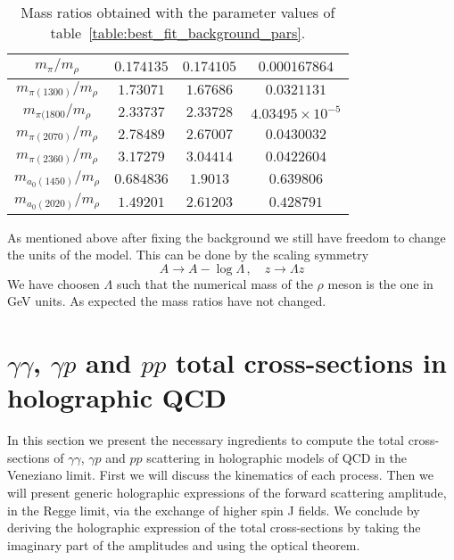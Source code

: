 \documentclass[a4paper,12pt]{article}
\begin{document}
\begin{table}
\begin{tabular}{ | c | c | c | c | }
$m_\pi / m_\rho$ & $0.174135$ & $0.174105$ & $0.000167864$ \\
\hline
$m_{\pi(1300)} / m_\rho$ & $1.73071$ & $1.67686$ & $0.0321131$ \\
\hline
$m_{\pi(1800} / m_\rho$ & $2.33737$ & $2.33728$ & $4.03495 \times 10^{-5}$ \\
\hline
$m_{\pi(2070)} / m_\rho$ & $2.78489$ & $2.67007$ & $0.0430032$ \\
\hline
$m_{\pi(2360)} / m_\rho$ & $3.17279$ & $3.04414$ & $0.0422604$ \\
\hline
$m_{a_0(1450)} / m_\rho$ & $0.684836$ & $1.9013$ & $0.639806$ \\
\hline
$m_{a_0(2020)} / m_\rho$ & $1.49201$ & $2.61203$ & $0.428791$ \\
\hline
\end{tabular}
\caption{Mass ratios obtained with the parameter values of table~\ref{table:best_fit_background_pars}.}
\label{table:best spectrum fit} 
\end{table}

As mentioned above after fixing the background we still have freedom to change the units of the model. This can be done by the scaling symmetry
\begin{equation}
A \rightarrow A - \log \Lambda \,, \quad z \rightarrow \Lambda z
\end{equation}
We have choosen $\Lambda$ such that the numerical mass of the $\rho$ meson is the one in GeV units. As expected the mass ratios have not changed.

\section{$\gamma\gamma$, $\gamma p$ and $pp$ total cross-sections in holographic QCD}
In this section we present the necessary ingredients to compute the total cross-sections of $\gamma\gamma$, $\gamma p$ and $pp$ scattering in holographic models of QCD in the Veneziano limit. First we will discuss the kinematics of each process. Then we will present generic holographic expressions of the forward scattering amplitude, in the Regge limit, via the exchange of higher spin J fields. We conclude by deriving the holographic expression of the total cross-sections by taking the imaginary part of the amplitudes and using the optical theorem.
\end{document}
